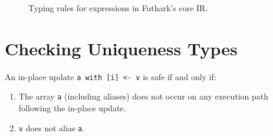 \begin{figure}[bt]









\caption{Typing rules for expressions in Futhark's core IR.}
\label{fig:srcTypeRulesExps}

\end{figure}


\FloatBarrier
\section{Checking Uniqueness Types}
\label{sec:uniqueness-formalism}

An in-place update \lstinline{a with [i] <- v} is safe if and only if:

\begin{enumerate}
\item The array \texttt{a} (including aliases) does not occur on any
  execution path following the in-place update.
\item \texttt{v} does not alias \texttt{a}.
\end{enumerate}

